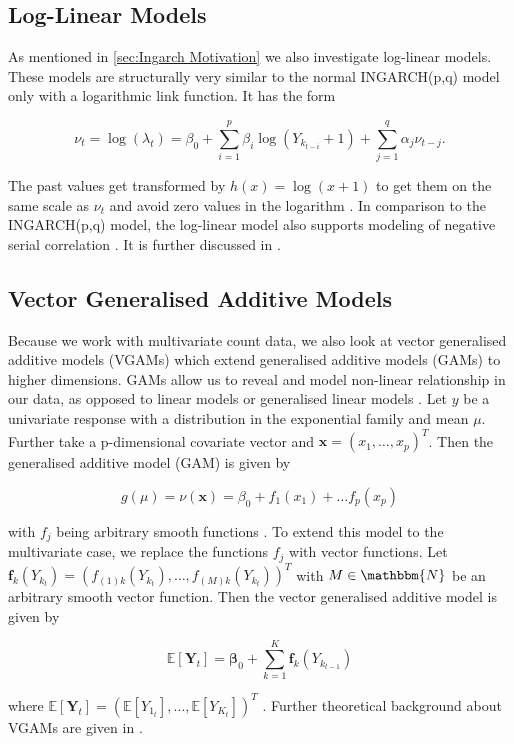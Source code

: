 \subsection{Log-Linear Models}
\label{sec: Log-Linear Models}

As mentioned in \ref{sec:Ingarch Motivation} we also investigate log-linear models. These models are structurally very similar to the normal INGARCH(p,q) model only with a logarithmic link function. It has the form 

\begin{equation}
\nu_t= \log(\lambda_t) = \beta_0 + \sum_{i=1}^p\beta_i \log(Y_{k_{t-i}}+1) + \sum_{j=1}^q\alpha_j \nu_{t-j}.
\label{eq:Log-Linear model}
\end{equation}

The past values get transformed by $h(x)=\log(x+1)$ to get them on the same scale as $\nu_t$ and avoid zero values in the logarithm \cite{Liboschik:2016,Fokianos:2011}. In comparison to the INGARCH(p,q) model, the log-linear model also supports modeling of negative serial correlation \cite{Liboschik:2016}. It is further discussed in \cite{Fokianos:2011,Woodard:2011,Douc:2013}.


\subsection{Vector Generalised Additive Models}
\label{sec:Vgam}

Because we work with multivariate count data, we also look at vector generalised additive models (VGAMs) which extend generalised additive models (GAMs) to higher dimensions. GAMs allow us to reveal and model non-linear relationship in our data, as opposed to linear models or generalised linear models \cite{Yee:1996}. Let $y$ be a univariate response with a distribution in the exponential family and mean $\mu$. Further take a p-dimensional covariate vector and $\bm{x}=(x_1,\ldots,x_p)^T$. Then the generalised additive model (GAM) is given by

\begin{equation}
g(\mu) = \nu(\bm{x}) = \beta_0 + f_1(x_1) + \ldots f_p(x_p)
\label{eq:Gam}
\end{equation}

with $f_j$ being arbitrary smooth functions \cite{Yee:1996}.
To extend this model to the multivariate case, we replace the functions $f_j$ with vector functions. Let $\bm{f}_k(Y_{k_{t}}) = (f_{(1)k}(Y_{k_{t}}),\ldots,f_{(M)k}(Y_{k_{t}}))^T$ with $M \in \mathbbm{N}$ be an arbitrary smooth vector function. Then the vector generalised additive model is given by

\begin{equation}
\mathbb{E}[\bm{Y}_t] = \bm{\beta}_0 + \sum_{k=1}^K\bm{f}_k(Y_{k_{t-1}})
\label{eq:Vgam}
\end{equation}

where $\mathbb{E}[\bm{Y}_t] = (\mathbb{E}[Y_{1_t}],\ldots,\mathbb{E}[Y_{K_t}])^T$ \cite{Yee:1996}. Further theoretical background about VGAMs are given in \cite{Yee:1996,Yee:2015,Wood:2004}.
